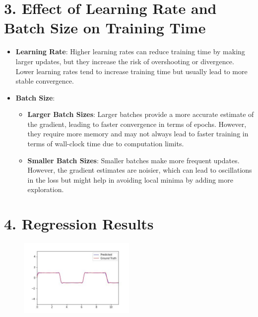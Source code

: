 \documentclass[10pt]{article}  %
\begin{document}
\section*{3. Effect of Learning Rate and Batch Size on Training Time}
\begin{itemize}
    \item \textbf{Learning Rate}: Higher learning rates can reduce training time by making larger updates, but they increase the risk of overshooting or divergence. Lower learning rates tend to increase training time but usually lead to more stable convergence.
    \item \textbf{Batch Size}:
        \begin{itemize}
            \item \textbf{Larger Batch Sizes}: Larger batches provide a more accurate estimate of the gradient, leading to faster convergence in terms of epochs. However, they require more memory and may not always lead to faster training in terms of wall-clock time due to computation limits.
            \item \textbf{Smaller Batch Sizes}: Smaller batches make more frequent updates. However, the gradient estimates are noisier, which can lead to oscillations in the loss but might help in avoiding local minima by adding more exploration.
        \end{itemize}
\end{itemize}

\section*{4. Regression Results}
\begin{figure}[h]
    \centering
    \includegraphics[width=0.5\textwidth]{lab4_basic_regression.jpg}
\end{figure}
\end{document}
